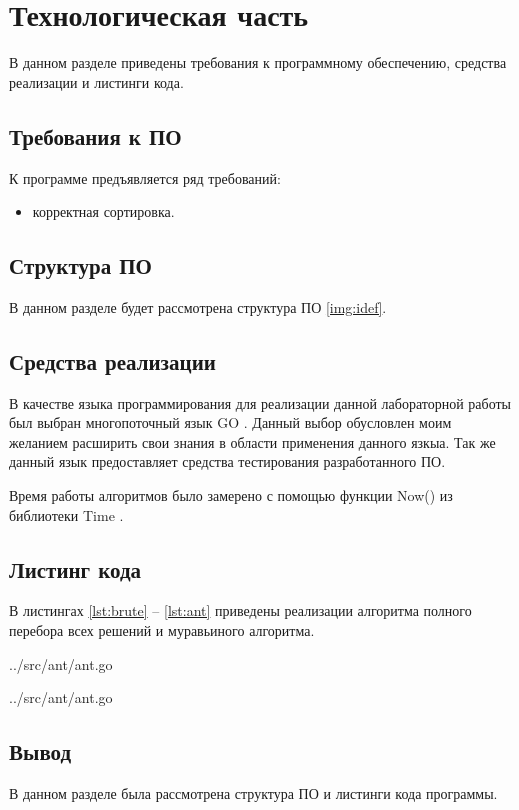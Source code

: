 \chapter{Технологическая часть}

В данном разделе приведены требования к программному обеспечению, средства реализации и листинги кода.

\section{Требования к ПО}

К программе предъявляется ряд требований:
\begin{itemize}
	\item корректная сортировка.
\end{itemize}

\section{Структура ПО}

В данном разделе будет рассмотрена структура ПО \ref{img:idef}.


\section{Средства реализации}

В качестве языка программирования для реализации данной лабораторной работы был выбран многопоточный язык GO \cite{golang}. Данный выбор обусловлен моим желанием расширить свои знания в области применения данного язкыа. Так же данный язык предоставляет средства тестирования разработанного ПО.

Время работы алгоритмов было замерено с помощью функции {\ttfamily Now()} из библиотеки {\ttfamily Time} \cite{lib:time}.

\clearpage

\section{Листинг кода}

В листингах \ref{lst:brute} -- \ref{lst:ant} приведены реализации алгоритма полного перебора всех решений и муравьиного алгоритма.

\begin{lstinputlisting}[
	caption={Алгоритм перебора всех возможных вариантов},
	label={lst:brute},
	style={go},
	linerange={194-245},
	]{../src/ant/ant.go}
\end{lstinputlisting}

\begin{lstinputlisting}[
	caption={Муравьиный алгоритм},
	label={lst:ant},
	style={go},
	linerange={85-192},
	]{../src/ant/ant.go}
\end{lstinputlisting}


\section*{Вывод}

В данном разделе была рассмотрена структура ПО и листинги кода программы.
